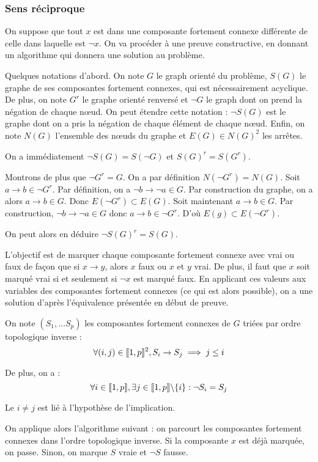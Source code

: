 \subsubsection{Sens réciproque}
On suppose que tout $x$ est dans une composante fortement connexe différente de
celle dans laquelle est $\neg x$. On va procéder à une preuve constructive, en
donnant un algorithme qui donnera une solution au problème.

Quelques notations d'abord. On note $G$ le graph orienté du problème, $S(G)$ le
graphe de ses composantes fortement connexes, qui est nécessairement acyclique.
De plus, on note $G^r$ le graphe orienté renversé et $\neg G$ le graph dont on
prend la négation de chaque nœud. On peut étendre cette notation : $\neg S(G)$
est le graphe dont on a pris la négation de chaque élément de chaque nœud.
Enfin, on note $N(G)$ l'ensemble des nœuds du graphe et $E(G) \in N(G)^2$ les
arrêtes.

On a immédiatement $\neg S(G) = S(\neg G)$ et $S(G)^r = S(G^r)$.

Montrons de plus que $\neg G^r = G$. On a par définition $N(\neg G^r) = N(G)$.
Soit $a \rightarrow b \in \neg G^r$. Par définition, on a $\neg b \rightarrow
\neg a \in G$. Par construction du graphe, on a alors $a \rightarrow b \in G$.
Donc $E(\neg G^r) \subset E(G)$. Soit maintenant $a \rightarrow b \in G$. Par
construction, $\neg b \rightarrow \neg a \in G$ donc $a \rightarrow b \in \neg
G^r$. D'où $E(g)\subset E(\neg G^r)$.

On peut alors en déduire $\neg S(G)^r = S(G)$.

L'objectif est de marquer chaque composante fortement connexe avec vrai ou faux
de façon que si $x \rightarrow y$, alors $x$ faux ou $x$ et $y$ vrai. De plus,
il faut que $x$ soit marqué vrai si et seulement si $\neg x$ est marqué faux.
En applicant ces valeurs aux variables des composantes fortement connexes
(ce qui est alors possible), on a une solution d'après l'équivalence présentée
en début de preuve.

On note $(S_1,\ldots S_p)$ les composantes fortement connexes de $G$ triées par
ordre topologique inverse :
    \[ \forall (i,j)\in\llbracket 1, p \rrbracket^2, S_i \rightarrow S_j \implies j \leq i \]

De plus, on a :
    \[ \forall i\in\llbracket 1, p \rrbracket, \exists j\in\llbracket 1, p \rrbracket\backslash\{i\}: \neg S_i = S_j \]

Le $i\neq j$ est lié à l'hypothèse de l'implication.

On applique alors l'algorithme suivant : on parcourt les composantes fortement
connexes dans l'ordre topologique inverse. Si la composante $x$ est déjà
marquée, on passe. Sinon, on marque $S$ vraie et $\neg S$ fausse.

